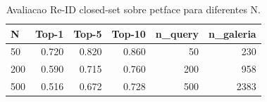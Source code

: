 \begin{table}[!htb]
\centering
\caption{Avaliacao Re-ID closed-set sobre petface para diferentes N.}
\label{tab:reid-resumo-petface}
\begin{tabular}{lrrrrr}
\toprule
N & Top-1 & Top-5 & Top-10 & n\_query & n\_galeria \\
\midrule
50 & 0.720 & 0.820 & 0.860 & 50 & 230 \\
200 & 0.590 & 0.715 & 0.760 & 200 & 958 \\
500 & 0.516 & 0.672 & 0.728 & 500 & 2383 \\
\bottomrule
\end{tabular}
\end{table}
